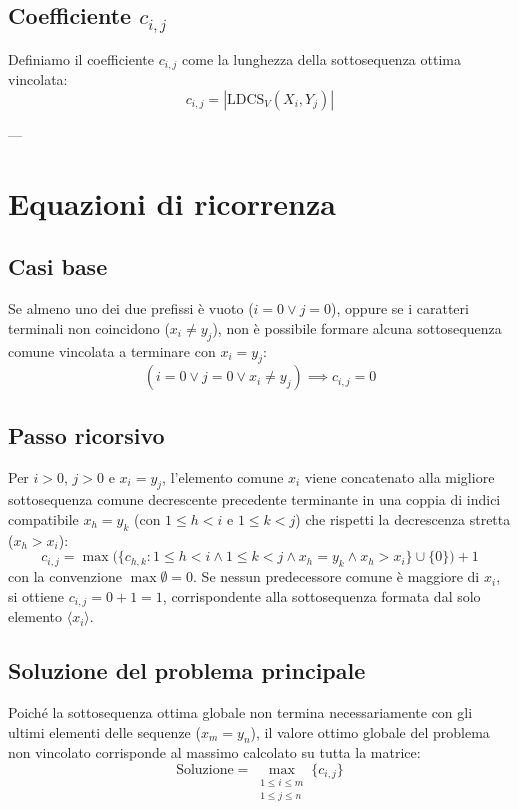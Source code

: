 \subsection{Coefficiente $c_{i,j}$}
Definiamo il coefficiente $c_{i,j}$ come la lunghezza della sottosequenza ottima vincolata:
\begin{equation*}
    c_{i,j} = |\text{LDCS}_V(X_i, Y_j)|
\end{equation*}

---

\section{Equazioni di ricorrenza}

\subsection{Casi base}
Se almeno uno dei due prefissi è vuoto ($i = 0 \lor j = 0$), oppure se i caratteri terminali non coincidono ($x_i \neq y_j$), non è possibile formare alcuna sottosequenza comune vincolata a terminare con $x_i = y_j$:
\begin{equation*}
    (i = 0 \lor j = 0 \lor x_i \neq y_j) \implies c_{i,j} = 0
\end{equation*}

\subsection{Passo ricorsivo}
Per $i > 0$, $j > 0$ e $x_i = y_j$, l'elemento comune $x_i$ viene concatenato alla migliore sottosequenza comune decrescente precedente terminante in una coppia di indici compatibile $x_h = y_k$ (con $1 \le h < i$ e $1 \le k < j$) che rispetti la decrescenza stretta ($x_h > x_i$):
\begin{equation*}
    c_{i,j} = \max \Big(\{ c_{h,k} : 1 \le h < i \land 1 \le k < j \land x_h = y_k \land x_h > x_i \} \cup \{0\}\Big) + 1
\end{equation*}
con la convenzione $\max \emptyset = 0$. Se nessun predecessore comune è maggiore di $x_i$, si ottiene $c_{i,j} = 0 + 1 = 1$, corrispondente alla sottosequenza formata dal solo elemento $\langle x_i \rangle$.

\subsection{Soluzione del problema principale}
Poiché la sottosequenza ottima globale non termina necessariamente con gli ultimi elementi delle sequenze ($x_m = y_n$), il valore ottimo globale del problema non vincolato corrisponde al massimo calcolato su tutta la matrice:
\begin{equation*}
    \text{Soluzione} = \max_{\substack{1 \le i \le m \\ 1 \le j \le n}} \{ c_{i,j} \}
\end{equation*}

